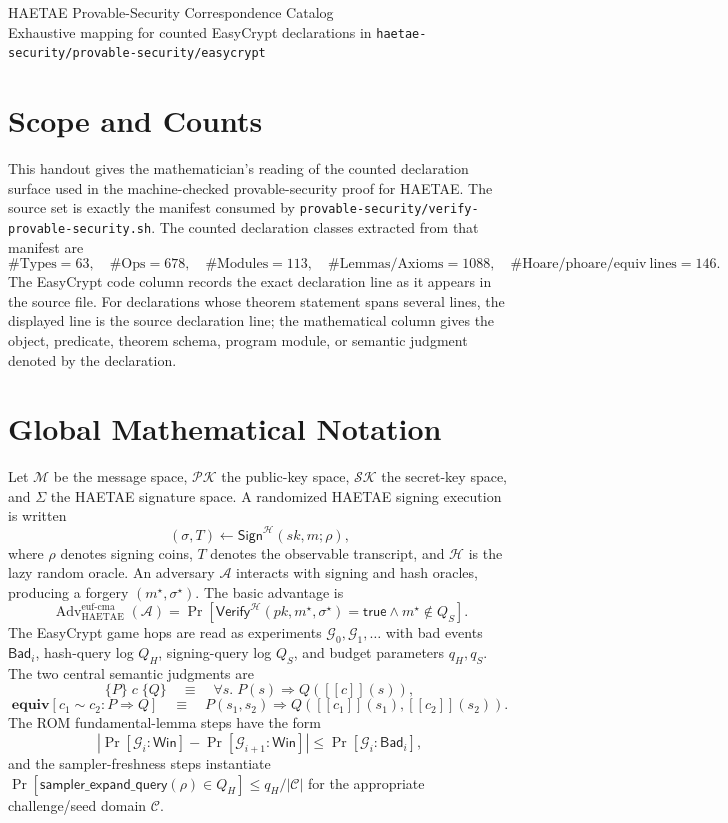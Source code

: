 \documentclass[10pt]{article}
\newcommand{\EC}[1]{\texttt{#1}}
\newcommand{\Adv}{\operatorname{Adv}}
\newcommand{\Prb}{\operatorname{Pr}}
\newcommand{\HROM}{\mathcal H}
\newcommand{\HGame}{\mathcal G}
\newcommand{\AdvA}{\mathcal A}
\newcommand{\QH}{Q_H}
\newcommand{\QS}{Q_S}
\begin{document}
\begin{center}
{\Large HAETAE Provable-Security Correspondence Catalog}\\[3pt]
{\small Exhaustive mapping for counted EasyCrypt declarations in \EC{haetae-security/provable-security/easycrypt}}
\end{center}

\section*{Scope and Counts}
This handout gives the mathematician's reading of the counted declaration surface used in the machine-checked provable-security proof for HAETAE.  The source set is exactly the manifest consumed by \EC{provable-security/verify-provable-security.sh}.
The counted declaration classes extracted from that manifest are
\[
\#\mathrm{Types}=63,\quad
\#\mathrm{Ops}=678,\quad
\#\mathrm{Modules}=113,\quad
\#\mathrm{Lemmas/Axioms}=1088,\quad
\#\mathrm{Hoare/phoare/equiv\ lines}=146.
\]
The EasyCrypt code column records the exact declaration line as it appears in the source file.  For declarations whose theorem statement spans several lines, the displayed line is the source declaration line; the mathematical column gives the object, predicate, theorem schema, program module, or semantic judgment denoted by the declaration.

\section*{Global Mathematical Notation}
Let \(\mathcal M\) be the message space, \(\mathcal{PK}\) the public-key space, \(\mathcal{SK}\) the secret-key space, and \(\Sigma\) the HAETAE signature space.  A randomized HAETAE signing execution is written
\[
  (\sigma,T)\leftarrow \mathsf{Sign}^{\HROM}(sk,m;\rho),
\]
where \(\rho\) denotes signing coins, \(T\) denotes the observable transcript, and \(\HROM\) is the lazy random oracle.  An adversary \(\AdvA\) interacts with signing and hash oracles, producing a forgery \((m^\star,\sigma^\star)\).  The basic advantage is
\[
  \Adv_{\mathrm{HAETAE}}^{\mathrm{euf\mbox{-}cma}}(\AdvA)
  = \Prb[\mathsf{Verify}^{\HROM}(pk,m^\star,\sigma^\star)=\mathsf{true} \wedge m^\star\notin\QS].
\]
The EasyCrypt game hops are read as experiments \(\HGame_0,\HGame_1,\ldots\) with bad events \(\mathsf{Bad}_i\), hash-query log \(\QH\), signing-query log \(\QS\), and budget parameters \(q_H,q_S\).  The two central semantic judgments are
\[
\{P\}\;c\;\{Q\}\quad\equiv\quad \forall s.\;P(s)\Rightarrow Q([\![ c]\!](s)),
\]
\[
\mathbf{equiv}[c_1\sim c_2:P\Rightarrow Q]\quad\equiv\quad P(s_1,s_2)\Rightarrow Q([\![ c_1]\!](s_1),[\![ c_2]\!](s_2)).
\]
The ROM fundamental-lemma steps have the form
\[
\left|\Prb[\HGame_i:\mathsf{Win}]-\Prb[\HGame_{i+1}:\mathsf{Win}]\right|\le \Prb[\HGame_i:\mathsf{Bad}_i],
\]
and the sampler-freshness steps instantiate \(\Prb[\mathsf{sampler\_expand\_query}(\rho)\in\QH]\le q_H/|\mathcal C|\) for the appropriate challenge/seed domain \(\mathcal C\).
\end{document}
